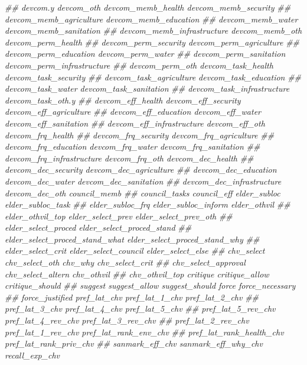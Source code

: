 \documentclass[
]{article}
\newenvironment{Shaded}{\begin{snugshade}}{\end{snugshade}}
\newcommand{\CommentTok}[1]{\textcolor[rgb]{0.56,0.35,0.01}{\textit{#1}}}
\begin{document}
\begin{Shaded}
\begin{Highlighting}[]
\CommentTok{##      devcom.y devcom_oth devcom_memb_health devcom_memb_security}
\CommentTok{##      devcom_memb_agriculture devcom_memb_education}
\CommentTok{##      devcom_memb_water devcom_memb_sanitation}
\CommentTok{##      devcom_memb_infrastructure devcom_memb_oth devcom_perm_health}
\CommentTok{##      devcom_perm_security devcom_perm_agriculture}
\CommentTok{##      devcom_perm_education devcom_perm_water}
\CommentTok{##      devcom_perm_sanitation devcom_perm_infrastructure}
\CommentTok{##      devcom_perm_oth devcom_task_health devcom_task_security}
\CommentTok{##      devcom_task_agriculture devcom_task_education}
\CommentTok{##      devcom_task_water devcom_task_sanitation}
\CommentTok{##      devcom_task_infrastructure devcom_task_oth.y}
\CommentTok{##      devcom_eff_health devcom_eff_security devcom_eff_agriculture}
\CommentTok{##      devcom_eff_education devcom_eff_water devcom_eff_sanitation}
\CommentTok{##      devcom_eff_infrastructure devcom_eff_oth devcom_frq_health}
\CommentTok{##      devcom_frq_security devcom_frq_agriculture}
\CommentTok{##      devcom_frq_education devcom_frq_water devcom_frq_sanitation}
\CommentTok{##      devcom_frq_infrastructure devcom_frq_oth devcom_dec_health}
\CommentTok{##      devcom_dec_security devcom_dec_agriculture}
\CommentTok{##      devcom_dec_education devcom_dec_water devcom_dec_sanitation}
\CommentTok{##      devcom_dec_infrastructure devcom_dec_oth council_memb}
\CommentTok{##      council_tasks council_eff elder_subloc elder_subloc_task}
\CommentTok{##      elder_subloc_frq elder_subloc_inform elder_othvil}
\CommentTok{##      elder_othvil_top elder_select_prev elder_select_prev_oth}
\CommentTok{##      elder_select_proced elder_select_proced_stand}
\CommentTok{##      elder_select_proced_stand_what elder_select_proced_stand_why}
\CommentTok{##      elder_select_crit elder_select_council elder_select_else}
\CommentTok{##      chv_select chv_select_oth chv_why chv_select_crit}
\CommentTok{##      chv_select_approval chv_select_altern chv_othvil}
\CommentTok{##      chv_othvil_top critique critique_allow critique_should}
\CommentTok{##      suggest suggest_allow suggest_should force force_necessary}
\CommentTok{##      force_justified pref_lat_chv pref_lat_1_chv pref_lat_2_chv}
\CommentTok{##      pref_lat_3_chv pref_lat_4_chv pref_lat_5_chv}
\CommentTok{##      pref_lat_5_rev_chv pref_lat_4_rev_chv pref_lat_3_rev_chv}
\CommentTok{##      pref_lat_2_rev_chv pref_lat_1_rev_chv pref_lat_rank_env_chv}
\CommentTok{##      pref_lat_rank_health_chv pref_lat_rank_priv_chv}
\CommentTok{##      sanmark_eff_chv sanmark_eff_why_chv recall_exp_chv}

\end{Highlighting}
\end{Shaded}
\end{document}
